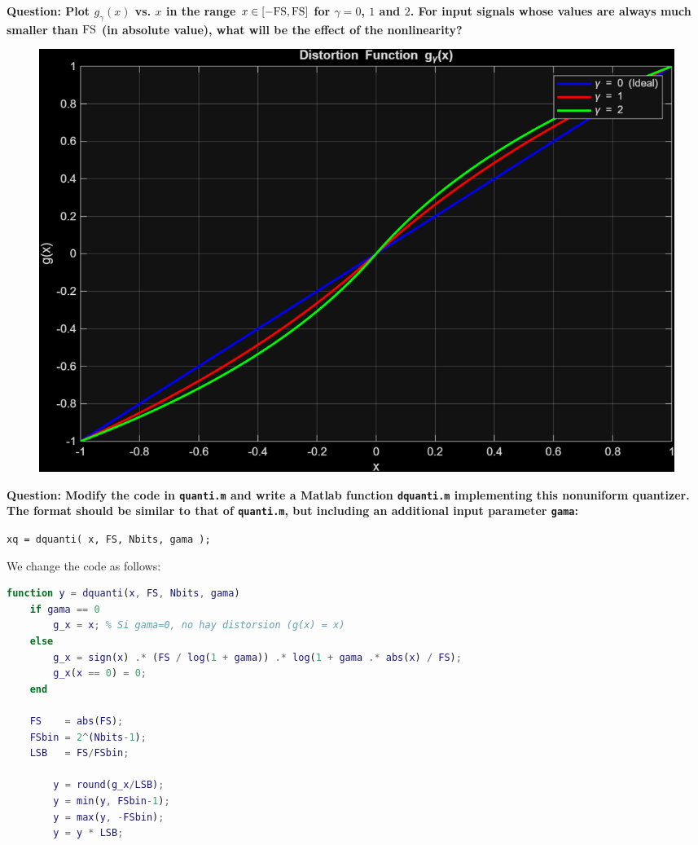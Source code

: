 \textbf{Question: Plot $g_\gamma(x)$ vs. $x$ in the range $x\in [-{\rm FS},{\rm FS}]$ for $\gamma = 0$, $1$ and $2$. For input signals whose values are always much smaller than $\rm FS$ (in absolute value), what will be the effect of the nonlinearity?
}
\vspace{0.5cm}

\begin{figure}[H]
    \centering
    \includegraphics[width=1\textwidth]{img/task5_1.png}
    \label{fig:task5_1}
\end{figure}

\vspace{1cm}
\textbf{Question: Modify the code in {\tt quanti.m} and write a Matlab function {\tt dquanti.m} implementing this nonuniform quantizer. The format should be similar to that of {\tt quanti.m}, but including an additional input parameter {\tt gama}:}
\begin{center}
{\tt xq = dquanti( x, FS, Nbits, gama ); }
\end{center} 
\vspace{0.5cm}

We change the code as follows:
\begin{lstlisting}[language=Matlab]
    function y = dquanti(x, FS, Nbits, gama)
    if gama == 0
        g_x = x; % Si gama=0, no hay distorsion (g(x) = x)
    else
        g_x = sign(x) .* (FS / log(1 + gama)) .* log(1 + gama .* abs(x) / FS);
        g_x(x == 0) = 0;
    end

    FS    = abs(FS);
    FSbin = 2^(Nbits-1);
    LSB   = FS/FSbin;  

        y = round(g_x/LSB); 
        y = min(y, FSbin-1); 
        y = max(y, -FSbin); 
        y = y * LSB;
\end{lstlisting}

